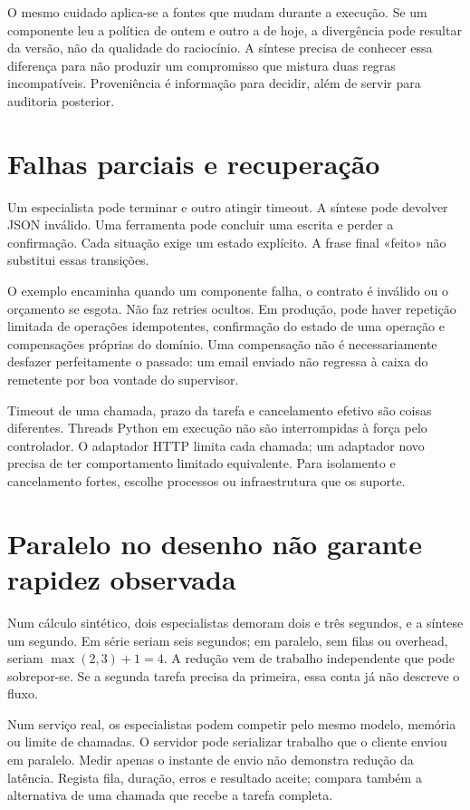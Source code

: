 O mesmo cuidado aplica-se a fontes que mudam durante a execução. Se um componente leu a política de ontem e outro a de hoje, a divergência pode resultar da versão, não da qualidade do raciocínio. A síntese precisa de conhecer essa diferença para não produzir um compromisso que mistura duas regras incompatíveis. Proveniência é informação para decidir, além de servir para auditoria posterior.

\section{Falhas parciais e recuperação}
Um especialista pode terminar e outro atingir timeout. A síntese pode devolver JSON inválido. Uma ferramenta pode concluir uma escrita e perder a confirmação. Cada situação exige um estado explícito. A frase final «feito» não substitui essas transições.

O exemplo encaminha quando um componente falha, o contrato é inválido ou o orçamento se esgota. Não faz retries ocultos. Em produção, pode haver repetição limitada de operações idempotentes, confirmação do estado de uma operação e compensações próprias do domínio. Uma compensação não é necessariamente desfazer perfeitamente o passado: um email enviado não regressa à caixa do remetente por boa vontade do supervisor.

Timeout de uma chamada, prazo da tarefa e cancelamento efetivo são coisas diferentes. Threads Python em execução não são interrompidas à força pelo controlador. O adaptador HTTP limita cada chamada; um adaptador novo precisa de ter comportamento limitado equivalente. Para isolamento e cancelamento fortes, escolhe processos ou infraestrutura que os suporte.

\section{Paralelo no desenho não garante rapidez observada}
Num cálculo sintético, dois especialistas demoram dois e três segundos, e a síntese um segundo. Em série seriam seis segundos; em paralelo, sem filas ou overhead, seriam $\max(2,3)+1=4$. A redução vem de trabalho independente que pode sobrepor-se. Se a segunda tarefa precisa da primeira, essa conta já não descreve o fluxo.

Num serviço real, os especialistas podem competir pelo mesmo modelo, memória ou limite de chamadas. O servidor pode serializar trabalho que o cliente enviou em paralelo. Medir apenas o instante de envio não demonstra redução da latência. Regista fila, duração, erros e resultado aceite; compara também a alternativa de uma chamada que recebe a tarefa completa.

